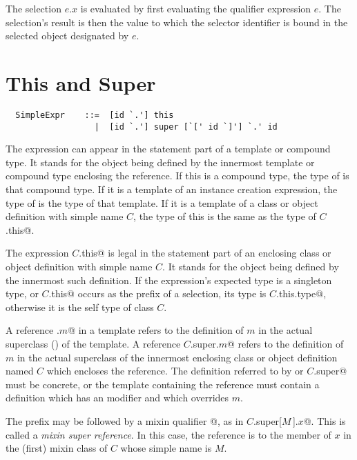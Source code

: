 \documentclass[a4paper,12pt,twoside,titlepage]{book}
\begin{document}
The selection $e.x$ is evaluated by first evaluating the qualifier
expression $e$. The selection's result is then the value to which the
selector identifier is bound in the selected object designated by $e$.

\section{This and Super}
\label{sec:this-super}

\syntax\begin{lstlisting}
  SimpleExpr    ::=  [id `.'] this
                  |  [id `.'] super [`[' id `]'] `.' id
\end{lstlisting}

The expression  can appear in the statement part of a
template or compound type. It stands for the object being defined by
the innermost template or compound type enclosing the reference. If
this is a compound type, the type of  is that compound type.
If it is a template of an instance creation expression, the type of
 is the type of that template. If it is a template of a
class or object definition with simple name $C$, the type of this
is the same as the type of \lstinline@$C$.this@.

The expression \lstinline@$C$.this@ is legal in the statement part of an
enclosing class or object definition with simple name $C$. It
stands for the object being defined by the innermost such definition.
If the expression's expected type is a singleton type, or
\lstinline@$C$.this@ occurs as the prefix of a selection, its type is
\lstinline@$C$.this.type@, otherwise it is the self type of class $C$.

A reference \lstinline@super.$m$@ in a template refers to the definition of
$m$ in the actual superclass () of the
template.  A reference \lstinline@$C$.super.$m$@ refers to the definition of
$m$ in the actual superclass of the innermost enclosing class or
object definition named $C$ which encloses the reference. The
definition referred to by  or \lstinline@$C$.super@ must be
concrete, or the template containing the reference must contain a
definition which has an  modifier and which overrides
$m$.

The  prefix may be followed by a mixin qualifier
\lstinline@[$M\,$]@, as in \lstinline@$C$.super[$M\,$].$x$@. This is called a {\em mixin
super reference}.  In this case, the reference is to the member of
$x$ in the (first) mixin class of $C$ whose simple name
is $M$.
\end{document}
